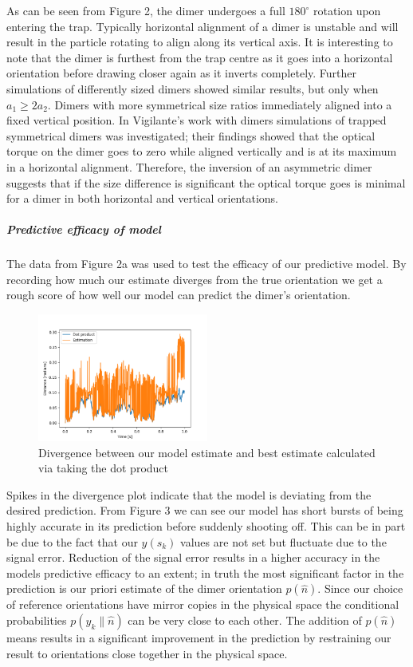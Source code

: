 \documentclass[11pt]{article}
\begin{document}
As can be seen from Figure 2, the dimer undergoes a full $180^{\circ}$ rotation upon entering the trap. Typically horizontal alignment of a dimer is unstable and will result in the particle rotating to align along its vertical axis. It is interesting to note that the dimer is furthest from the trap centre as it goes into a horizontal orientation before drawing closer again as it inverts completely. Further simulations of differently sized dimers showed similar results, but only when $a_1 \geq 2a_2$. Dimers with more symmetrical size ratios immediately aligned into a fixed vertical position. 
In Vigilante's work with dimers \cite{5} simulations of trapped symmetrical dimers was investigated; their findings showed that the optical torque on the dimer goes to zero while aligned vertically and is at its maximum in a horizontal alignment. Therefore, the inversion of an asymmetric dimer suggests that if the size difference is significant the optical torque goes is minimal for a dimer in both horizontal and vertical orientations. 

\subparagraph*{Predictive efficacy of model}
The data from Figure 2a was used to test the efficacy of our predictive model. By recording how much our estimate diverges from the true orientation we get a rough score of how well our model can predict the dimer's orientation.

\begin{figure}[h]
	\centering
	\includegraphics[width=0.5\textwidth]{Divergance.png}
	\caption{Divergence between our model estimate and best estimate calculated via taking the dot product}
\end{figure}

Spikes in the divergence plot indicate that the model is deviating  from the desired prediction. From Figure 3 we can see our model has short bursts of being highly accurate in its prediction before suddenly shooting off. This can be in part be due to the fact that our $y(\hat{s}_k)$ values are not set but fluctuate due to the signal error. Reduction of the signal error results in a higher accuracy in the models predictive efficacy to an extent; in truth the most significant factor in the prediction is our priori estimate of the dimer orientation $p(\hat{n})$. Since our choice of reference orientations have mirror copies in the physical space the conditional probabilities $p(y_k\parallel\hat{n})$ can be very close to each other. The addition of $p(\hat{n})$ means results in a significant improvement in the prediction by restraining our result to orientations close together in the physical space. 
\end{document}
